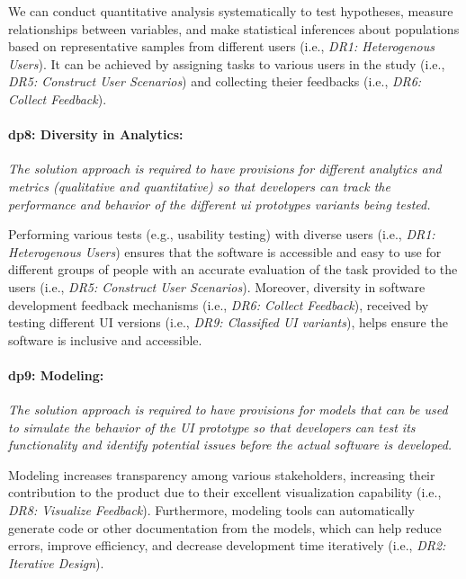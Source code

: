 We can conduct quantitative analysis systematically to test hypotheses, measure relationships between variables, and make statistical inferences about populations based on representative samples from different users (i.e., \textit{DR1: Heterogenous Users}).
It can be achieved by assigning tasks to various users in the study (i.e., \textit{DR5: Construct User Scenarios}) and collecting theier feedbacks (i.e., \textit{DR6: Collect Feedback}).

\paragraph{\ac{dp}8: Diversity in Analytics:} \textit{The solution approach is required to have provisions for different analytics and metrics (qualitative and quantitative) so that developers can track the performance and behavior of the different \ac{ui} prototypes variants being tested.}

Performing various tests (e.g., usability testing) with diverse users (i.e., \textit{DR1: Heterogenous Users}) ensures that the software is accessible and easy to use for different groups of people with an accurate evaluation of the task provided to the users (i.e., \textit{DR5: Construct User Scenarios}).
Moreover, diversity in software development feedback mechanisms (i.e., \textit{DR6: Collect Feedback}), received by testing different UI versions (i.e., \textit{DR9: Classified UI variants}), helps ensure the software is inclusive and accessible.

\paragraph{\ac{dp}9: Modeling:} \textit{The solution approach is required to have provisions for models that can be used to simulate the behavior of the UI prototype so that developers can test its functionality and identify potential issues before the actual software is developed.}

Modeling increases transparency among various stakeholders, increasing their contribution to the product due to their excellent visualization capability (i.e., \textit{DR8: Visualize Feedback}).
Furthermore, modeling tools can automatically generate code or other documentation from the models, which can help reduce errors, improve efficiency, and decrease development time iteratively (i.e., \textit{DR2: Iterative Design}).



